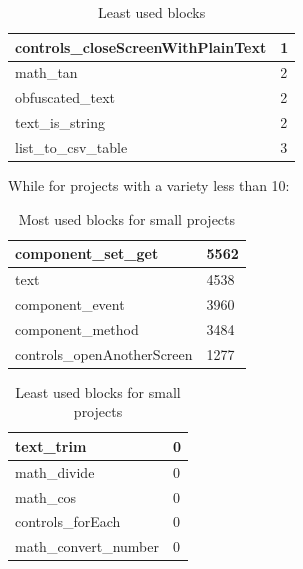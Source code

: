 \documentclass[a4paper]{article}
\begin{document}
\begin{table}[ht]
\begin{center}
\caption{Least used blocks}

\bigskip

\begin{tabular}{|l|l|}
\hline
controls\_closeScreenWithPlainText & 1\\ \hline
math\_tan & 2\\ \hline
obfuscated\_text & 2\\ \hline
text\_is\_string & 2\\ \hline
list\_to\_csv\_table & 3\\ \hline
\end{tabular}
\end{center}
\end{table}

While for projects with a variety less than 10:

\begin{table}[ht]
\begin{center}
\caption{Most used blocks for small projects}

\bigskip

\begin{tabular}{|l|l|}
\hline
component\_set\_get & 5562\\ \hline
text & 4538\\ \hline
component\_event & 3960\\ \hline
component\_method & 3484\\ \hline
controls\_openAnotherScreen & 1277\\ \hline
\end{tabular}
\end{center}
\end{table}

\begin{table}[ht]
\begin{center}
\caption{Least used blocks for small projects}

\bigskip

\begin{tabular}{|l|l|}
\hline
text\_trim & 0\\ \hline
math\_divide & 0\\ \hline
math\_cos & 0\\ \hline
controls\_forEach & 0\\ \hline
math\_convert\_number & 0\\ \hline
\end{tabular}
\end{center}
\end{table}
\end{document}
